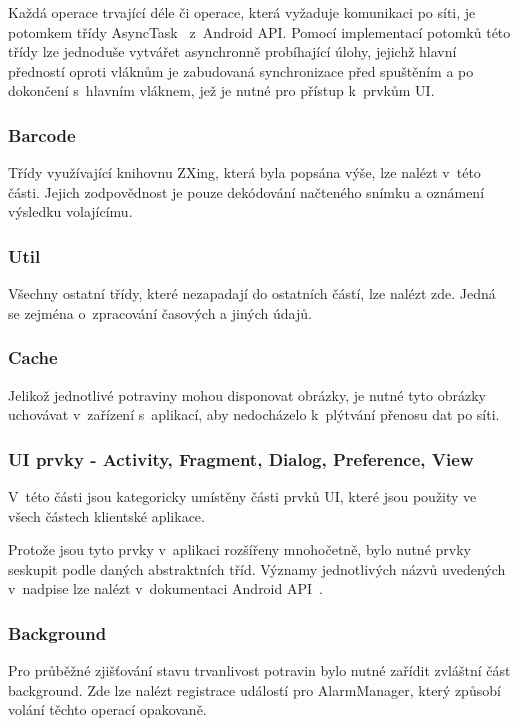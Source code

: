 \documentclass[thesis=B,czech]{FITthesis}[2013/10/20]
\begin{document}
Každá operace trvající déle či operace, která vyžaduje komunikaci po síti, je potomkem třídy AsyncTask~\cite{async_task} z~Android API. Pomocí implementací potomků této třídy lze jednoduše vytvářet asynchronně probíhající úlohy, jejichž hlavní předností oproti vláknům je zabudovaná synchronizace před spuštěním a po dokončení s~hlavním vláknem, jež je nutné pro přístup k~prvkům UI.

\subsubsection{Barcode}

Třídy využívající knihovnu ZXing, která byla popsána výše, lze nalézt v~této části. Jejich zodpovědnost je pouze dekódování načteného snímku a oznámení výsledku volajícímu.

\subsubsection{Util}

Všechny ostatní třídy, které nezapadají do ostatních částí, lze nalézt zde. Jedná se zejména o~zpracování časových a jiných údajů.

\subsubsection{Cache}

Jelikož jednotlivé potraviny mohou disponovat obrázky, je nutné tyto obrázky uchovávat v~zařízení s~aplikací, aby nedocházelo k~plýtvání přenosu dat po síti.

\subsubsection{UI prvky - Activity, Fragment, Dialog, Preference, View}

V~této části jsou kategoricky umístěny části prvků UI, které jsou použity ve všech částech klientské aplikace.

Protože jsou tyto prvky v~aplikaci rozšířeny mnohočetně, bylo nutné prvky seskupit podle daných abstraktních tříd. Významy jednotlivých názvů uvedených v~nadpise lze nalézt v~dokumentaci Android API~\cite{android_api}. 

\subsubsection{Background}

Pro průběžné zjišťování stavu trvanlivost potravin bylo nutné zařídit zvláštní část background. Zde lze nalézt registrace událostí pro AlarmManager\cite{alarm_manager}, který způsobí volání těchto operací opakovaně.
\end{document}
